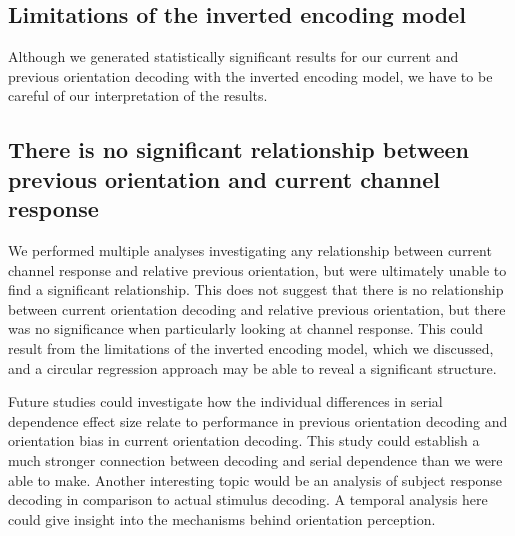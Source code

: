 \documentclass[../main.tex]{subfiles}
\begin{document}
\subsection{Limitations of the inverted encoding model}
Although we generated statistically significant results for our current and previous orientation decoding with the inverted encoding model, we have to be careful of our interpretation of the results. 

\subsection{There is no significant relationship between previous orientation and current channel response}
We performed multiple analyses investigating any relationship between current channel response and relative previous orientation, but were ultimately unable to find a significant relationship. This does not suggest that there is no relationship between current orientation decoding and relative previous orientation, but there was no significance when particularly looking at channel response. This could result from the limitations of the inverted encoding model, which we discussed, and a circular regression approach may be able to reveal a significant structure. 

Future studies could investigate how the individual differences in serial dependence effect size relate to performance in previous orientation decoding and orientation bias in current orientation decoding. This study could establish a much stronger connection between decoding and serial dependence than we were able to make. Another interesting topic would be an analysis of subject response decoding in comparison to actual stimulus decoding. A temporal analysis here could give insight into the mechanisms behind orientation perception.
\end{document}
